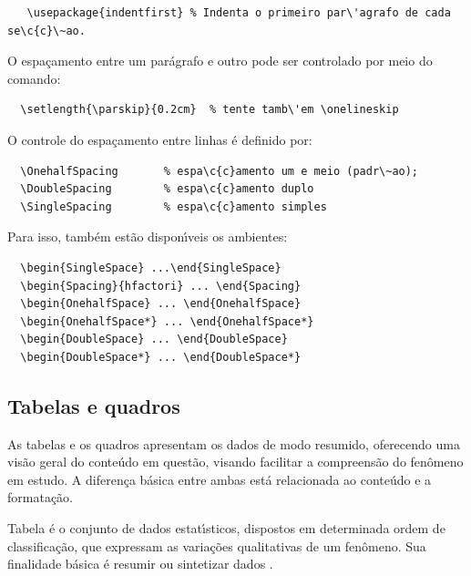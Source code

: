 \begin{verbatim}
   \usepackage{indentfirst} % Indenta o primeiro par\'agrafo de cada se\c{c}\~ao.
\end{verbatim}

O espa\c{c}amento entre um par\'agrafo e outro
pode ser controlado por meio do comando:

\begin{verbatim}
  \setlength{\parskip}{0.2cm}  % tente tamb\'em \onelineskip
\end{verbatim}

O controle do espa\c{c}amento entre linhas \'e
definido por:
\begin{verbatim}
  \OnehalfSpacing       % espa\c{c}amento um e meio (padr\~ao); 
  \DoubleSpacing        % espa\c{c}amento duplo
  \SingleSpacing        % espa\c{c}amento simples	
\end{verbatim}

Para isso, tamb\'em est\~ao dispon\'{\i}veis os ambientes:
\begin{verbatim}
  \begin{SingleSpace} ...\end{SingleSpace}
  \begin{Spacing}{hfactori} ... \end{Spacing}
  \begin{OnehalfSpace} ... \end{OnehalfSpace}
  \begin{OnehalfSpace*} ... \end{OnehalfSpace*}
  \begin{DoubleSpace} ... \end{DoubleSpace}
  \begin{DoubleSpace*} ... \end{DoubleSpace*} 
\end{verbatim}

\subsection{Tabelas e quadros}

As tabelas e os quadros apresentam os dados de modo resumido, oferecendo uma vis\~ao geral do conte\'udo em quest\~ao, visando facilitar a compreens\~ao do fen\^omeno em estudo. A diferen\c{c}a b\'asica entre ambas est\'a relacionada ao conte\'udo e a formata\c{c}\~ao. 

Tabela \'e o conjunto de dados estat\'{\i}sticos, dispostos em determinada ordem de classifica\c{c}\~ao, que expressam as varia\c{c}\~oes qualitativas de um fen\^omeno. Sua finalidade b\'asica \'e resumir ou sintetizar dados \cite{sibi2016}.

